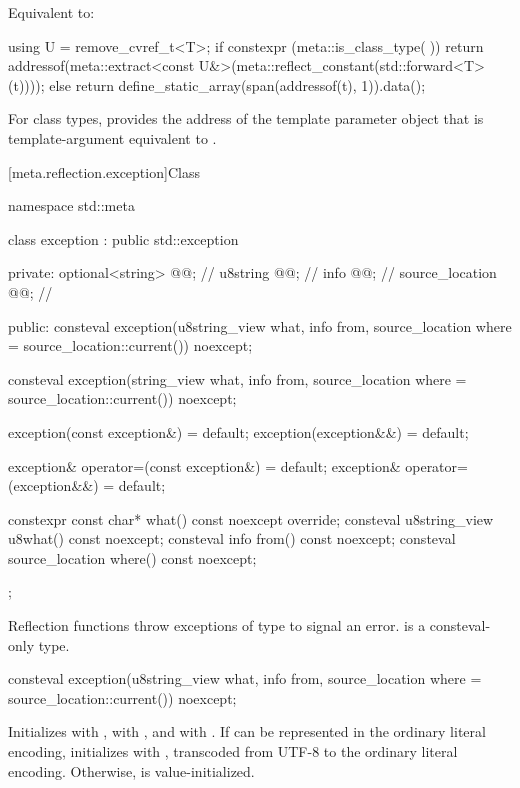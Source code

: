 \begin{itemdescr}
\pnum
\effects
Equivalent to:
\begin{codeblock}
using U = remove_cvref_t<T>;
if constexpr (meta::is_class_type(^^U)) {
  return addressof(meta::extract<const U&>(meta::reflect_constant(std::forward<T>(t))));
} else {
  return define_static_array(span(addressof(t), 1)).data();
}
\end{codeblock}

\pnum
\begin{note}
For class types,
 provides
the address of the template parameter object
that is template-argument equivalent to .
\end{note}
\end{itemdescr}

[meta.reflection.exception]{Class }

%
\begin{codeblock}
namespace std::meta {
  class exception : public std::exception {
  private:
    optional<string> @@;     // \expos
    u8string @@;           // \expos
    info @@;                 // \expos
    source_location @@;     // \expos

  public:
    consteval exception(u8string_view what, info from,
                        source_location where = source_location::current()) noexcept;

    consteval exception(string_view what, info from,
                        source_location where = source_location::current()) noexcept;

    exception(const exception&) = default;
    exception(exception&&) = default;

    exception& operator=(const exception&) = default;
    exception& operator=(exception&&) = default;

    constexpr const char* what() const noexcept override;
    consteval u8string_view u8what() const noexcept;
    consteval info from() const noexcept;
    consteval source_location where() const noexcept;
  };
}
\end{codeblock}

\pnum
Reflection functions throw exceptions of type 
to signal an error.
 is a consteval-only type.

%
\begin{itemdecl}
consteval exception(u8string_view what, info from,
                    source_location where = source_location::current()) noexcept;
\end{itemdecl}
\begin{itemdescr}
\pnum
\effects
Initializes
 with ,
 with , and
 with .
If  can be represented in the ordinary literal encoding,
initializes  with ,
transcoded from UTF-8 to the ordinary literal encoding.
Otherwise,  is value-initialized.
\end{itemdescr}

